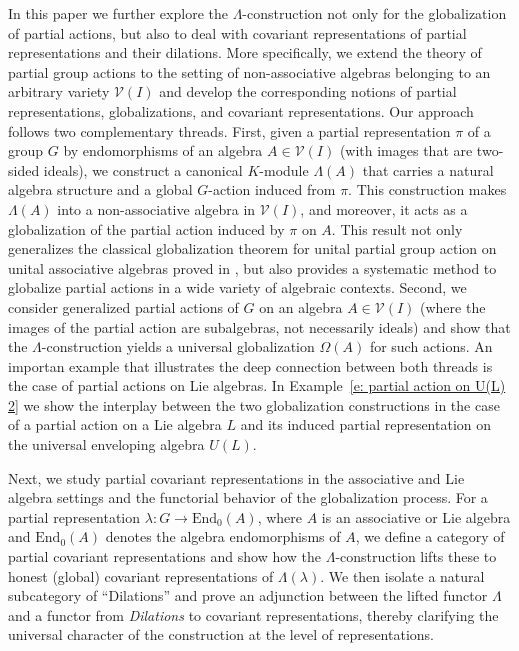 \documentclass[11pt]{amsart}
\numberwithin{equation}{section}
\theoremstyle{definition}
\theoremstyle{remark}
\begin{document}
  In this paper we further  explore the $\Lambda $-construction not only for the globalization of partial actions, but also to deal with covariant representations of partial representations and their dilations.  
  More specifically,  we extend the theory of partial group actions to the setting of non-associative algebras belonging to an arbitrary variety \(\mathcal{V}(I)\) and develop the corresponding notions of partial representations, globalizations, and covariant representations. Our approach follows two complementary threads.
First, given a partial representation \(\pi\) of a group \(G\) by endomorphisms of an algebra \(A\in \mathcal{V}(I)\) (with images that are two-sided ideals), we construct a canonical \(K\)-module \(\Lambda(A)\) that carries a natural algebra structure and a global \(G\)-action induced from \(\pi\).
This construction makes \(\Lambda(A)\) into a non-associative algebra in \(\mathcal{V}(I)\),
and moreover, it acts as a globalization of the partial action induced by \(\pi\) on \(A\).
This result not only generalizes the classical globalization theorem for unital partial group action on unital associative algebras  proved in \cite{Article_Dokuchaev-Exel_2005_AOCPBPAEAAPR}, but also provides a systematic method to globalize partial actions in a wide variety of algebraic contexts.
Second, we consider generalized partial actions of \(G\) on an algebra \(A\in \mathcal{V}(I)\) (where the images of the partial action are subalgebras, not necessarily ideals) and show that the \(\Lambda\)-construction yields a universal globalization \(\Omega(A)\) for such actions.
An importan example that illustrates the deep connection between both threads is the case of partial actions on Lie algebras.
In Example~\ref{e: partial action on U(L) 2} we show the interplay between the two globalization constructions in the case of a partial action on a Lie algebra \(L\) and its induced partial representation on the universal enveloping algebra \(U(L)\).

Next, we study partial covariant representations  in the  associative and Lie algebra settings and the functorial behavior of the globalization process.
For a partial representation  \(\lambda\colon G\to\mathrm{End}_0 (A)\), where $A$ is an associative or Lie algebra and $\mathrm{End}_0 (A)$ denotes  the algebra endomorphisms of $A$,   we define a category of partial covariant representations and show how the \(\Lambda\)-construction lifts these to honest (global) covariant representations of \(\Lambda(\lambda)\).
We then isolate a natural subcategory of ``Dilations'' and prove an adjunction between the lifted functor \(\Lambda\) and a functor from \textit{Dilations} to covariant representations, thereby clarifying the universal character of the construction at the level of representations.
\end{document}
